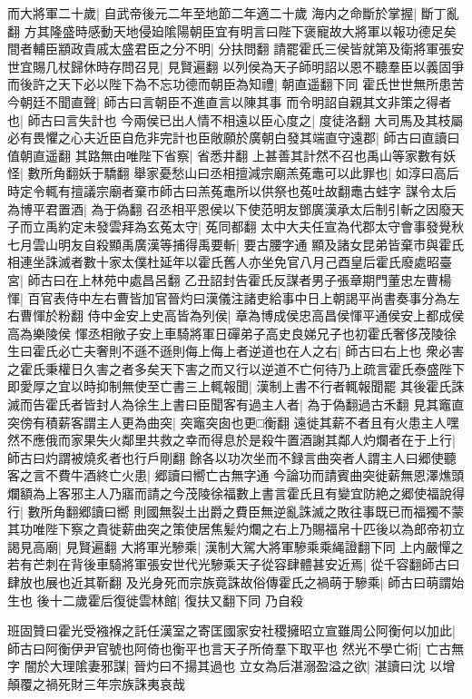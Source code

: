 而大將軍二十歲|{
	自武帝後元二年至地節二年適二十歲}
海内之命斷於掌握|{
	斷丁亂翻}
方其隆盛時感動天地侵廹隂陽朝臣宜有明言曰陛下褒寵故大將軍以報功德足矣間者輔臣顓政貴戚太盛君臣之分不明|{
	分扶問翻}
請罷霍氏三侯皆就第及衛將軍張安世宜賜几杖歸休時存問召見|{
	見賢遍翻}
以列侯為天子師明詔以恩不聽羣臣以義固爭而後許之天下必以陛下為不忘功德而朝臣為知禮|{
	朝直遥翻下同}
霍氏世世無所患苦今朝廷不聞直聲|{
	師古曰言朝臣不進直言以陳其事}
而令明詔自親其文非策之得者也|{
	師古曰言失計也}
今兩侯已出人情不相遠以臣心度之|{
	度徒洛翻}
大司馬及其枝屬必有畏懼之心夫近臣自危非完計也臣敞願於廣朝白發其端直守遠郡|{
	師古曰直讀曰值朝直遥翻}
其路無由唯陛下省察|{
	省悉井翻}
上甚善其計然不召也禹山等家數有妖怪|{
	數所角翻妖于驕翻}
舉家憂愁山曰丞相擅減宗廟羔菟鼃可以此罪也|{
	如淳曰高后時定令輒有擅議宗廟者棄市師古曰羔菟鼃所以供祭也菟吐故翻鼃古蛙字}
謀令太后為博平君置酒|{
	為于偽翻}
召丞相平恩侯以下使范明友鄧廣漢承太后制引斬之因廢天子而立禹約定未發雲拜為玄菟太守|{
	菟同都翻}
太中大夫任宣為代郡太守會事發覺秋七月雲山明友自殺顯禹廣漢等捕得禹要斬|{
	要古腰字通}
顯及諸女昆弟皆棄市與霍氏相連坐誅滅者數十家太僕杜延年以霍氏舊人亦坐免官八月己酉皇后霍氏廢處昭臺宮|{
	師古曰在上林苑中處昌呂翻}
乙丑詔封告霍氏反謀者男子張章期門董忠左曹楊惲|{
	百官表侍中左右曹皆加官晉灼曰漢儀注諸吏給事中日上朝謁平尚書奏事分為左右曹惲於粉翻}
侍中金安上史高皆為列侯|{
	章為博成侯忠高昌侯惲平通侯安上都成侯高為樂陵侯}
惲丞相敞子安上車騎將軍日磾弟子高史良娣兄子也初霍氏奢侈茂陵徐生曰霍氏必亡夫奢則不遜不遜則侮上侮上者逆道也在人之右|{
	師古曰右上也}
衆必害之霍氏秉權日久害之者多矣天下害之而又行以逆道不亡何待乃上疏言霍氏泰盛陛下即愛厚之宜以時抑制無使至亡書三上輒報聞|{
	漢制上書不行者輒報聞罷}
其後霍氏誅滅而告霍氏者皆封人為徐生上書曰臣聞客有過主人者|{
	為于偽翻過古禾翻}
見其竈直突傍有積薪客謂主人更為曲突|{
	突竈突囱也更□衡翻}
遠徙其薪不者且有火患主人嘿然不應俄而家果失火鄰里共救之幸而得息於是殺牛置酒謝其鄰人灼爛者在于上行|{
	師古曰灼謂被燒炙者也行戶剛翻}
餘各以功次坐而不録言曲突者人謂主人曰郷使聽客之言不費牛酒終亡火患|{
	郷讀曰嚮亡古無字通}
今論功而請賓曲突徙薪無恩澤燋頭爛額為上客邪主人乃寤而請之今茂陵徐福數上書言霍氏且有變宜防絶之郷使福說得行|{
	數所角翻郷讀曰嚮}
則國無裂土出爵之費臣無逆亂誅滅之敗往事既已而福獨不蒙其功唯陛下察之貴徙薪曲突之策使居焦髪灼爛之右上乃賜福帛十匹後以為郎帝初立謁見高廟|{
	見賢遍翻}
大將軍光驂乘|{
	漢制大駕大將軍驂乘乘䋲證翻下同}
上内嚴憚之若有芒刺在背後車騎將軍張安世代光驂乘天子從容肆體甚安近焉|{
	從千容翻師古曰肆放也展也近其靳翻}
及光身死而宗族竟誅故俗傳霍氏之禍萌于驂乘|{
	師古曰萌謂始生也}
後十二歲霍后復徙雲林館|{
	復扶又翻下同}
乃自殺

班固贊曰霍光受襁褓之託任漢室之寄匡國家安社稷擁昭立宣雖周公阿衡何以加此|{
	師古曰阿衡伊尹官號也阿倚也衡平也言天子所倚羣下取平也}
然光不學亡術|{
	亡古無字}
闇於大理隂妻邪謀|{
	晉灼曰不揚其過也}
立女為后湛溺盈溢之欲|{
	湛讀曰沈}
以增顛覆之禍死財三年宗族誅夷哀哉

